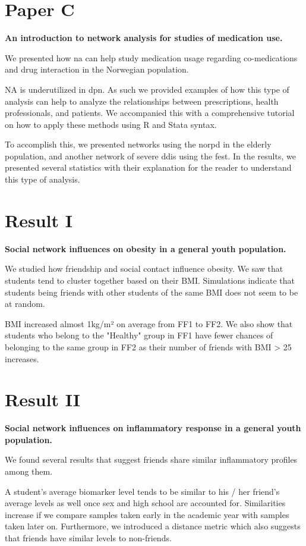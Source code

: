 \section{Paper C}

\textbf{An introduction to network analysis for studies of medication use.}

We presented how \gls{na} can help study medication usage regarding co-medications and drug interaction in the Norwegian population.

NA is underutilized in \gls{dpn}. As such we provided examples of how this type of analysis can help to analyze the relationships between prescriptions, health professionals, and patients. We accompanied this with a comprehensive tutorial on how to apply these methods using R and Stata syntax.

To accomplish this, we presented networks using the \gls{norpd} in the elderly population, and another network of severe \gls{ddis} using the \gls{fest}. In the results, we presented several statistics with their explanation for the reader to understand this type of analysis.

\section{Result I}

\textbf{Social network influences on obesity in a general youth population.}

We studied how friendship and social contact influence obesity. We saw that students tend to cluster together based on their BMI. Simulations indicate that students being friends with other students of the same BMI does not seem to be at random.

BMI increased almost 1kg/m² on average from FF1 to FF2. We also show that students who belong to the "Healthy" group in FF1 have fewer chances of belonging to the same group in FF2 as their number of friends with BMI > 25 increases.

\section{Result II}

\textbf{Social network influences on inflammatory response in a general youth population.}

We found several results that suggest friends share similar inflammatory profiles among them.

A student's average biomarker level tends to be similar to his / her friend's average levels as well once sex and high school are accounted for. Similarities increase if we compare samples taken early in the academic year with samples taken later on. Furthermore, we introduced a distance metric which also suggests that friends have similar levels to non-friends.


